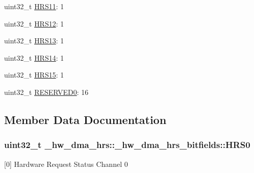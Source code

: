 \begin{DoxyCompactItemize}
\item 
uint32\+\_\+t \hyperlink{struct__hw__dma__hrs_1_1__hw__dma__hrs__bitfields_a3a06ac717055c352209daad367a74334}{H\+R\+S11}\+: 1
\item 
uint32\+\_\+t \hyperlink{struct__hw__dma__hrs_1_1__hw__dma__hrs__bitfields_a9cf52047b3590847610ceb153d259baa}{H\+R\+S12}\+: 1
\item 
uint32\+\_\+t \hyperlink{struct__hw__dma__hrs_1_1__hw__dma__hrs__bitfields_a4b668e752da0667ff0fcae4006f948a0}{H\+R\+S13}\+: 1
\item 
uint32\+\_\+t \hyperlink{struct__hw__dma__hrs_1_1__hw__dma__hrs__bitfields_a099357ffc9ce611091bc8df3e1393d70}{H\+R\+S14}\+: 1
\item 
uint32\+\_\+t \hyperlink{struct__hw__dma__hrs_1_1__hw__dma__hrs__bitfields_ad2f4d6725dfa47e9d07bec827b777371}{H\+R\+S15}\+: 1
\item 
uint32\+\_\+t \hyperlink{struct__hw__dma__hrs_1_1__hw__dma__hrs__bitfields_a33baa3314823ac91cf32dc8e5a6a8b90}{R\+E\+S\+E\+R\+V\+E\+D0}\+: 16
\end{DoxyCompactItemize}


\subsection{Member Data Documentation}
\subsubsection[{\texorpdfstring{H\+R\+S0}{HRS0}}]{\setlength{\rightskip}{0pt plus 5cm}uint32\+\_\+t \+\_\+hw\+\_\+dma\+\_\+hrs\+::\+\_\+hw\+\_\+dma\+\_\+hrs\+\_\+bitfields\+::\+H\+R\+S0}\hypertarget{struct__hw__dma__hrs_1_1__hw__dma__hrs__bitfields_a26eff644aadef2b905c531a0a363908b}{}\label{struct__hw__dma__hrs_1_1__hw__dma__hrs__bitfields_a26eff644aadef2b905c531a0a363908b}
\mbox{[}0\mbox{]} Hardware Request Status Channel 0 
